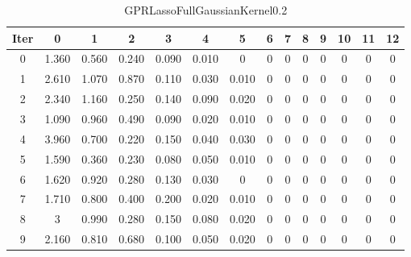 \begin{table}
	\begin{center}
		\begin{tabular}{|c|c|c|c|c|c|c|c|c|c|c|c|c|c|}
			\hline
			Iter & 0 & 1 & 2 & 3 & 4 & 5 & 6 & 7 & 8 & 9 & 10 & 11 & 12 \\
			\hline
			0 & 1.360 & 0.560 & 0.240 & 0.090 & 0.010 & 0 & 0 & 0 & 0 & 0 & 0 & 0 & 0 \\
			\hline
			1 & 2.610 & 1.070 & 0.870 & 0.110 & 0.030 & 0.010 & 0 & 0 & 0 & 0 & 0 & 0 & 0 \\
			\hline
			2 & 2.340 & 1.160 & 0.250 & 0.140 & 0.090 & 0.020 & 0 & 0 & 0 & 0 & 0 & 0 & 0 \\
			\hline
			3 & 1.090 & 0.960 & 0.490 & 0.090 & 0.020 & 0.010 & 0 & 0 & 0 & 0 & 0 & 0 & 0 \\
			\hline
			4 & 3.960 & 0.700 & 0.220 & 0.150 & 0.040 & 0.030 & 0 & 0 & 0 & 0 & 0 & 0 & 0 \\
			\hline
			5 & 1.590 & 0.360 & 0.230 & 0.080 & 0.050 & 0.010 & 0 & 0 & 0 & 0 & 0 & 0 & 0 \\
			\hline
			6 & 1.620 & 0.920 & 0.280 & 0.130 & 0.030 & 0 & 0 & 0 & 0 & 0 & 0 & 0 & 0 \\
			\hline
			7 & 1.710 & 0.800 & 0.400 & 0.200 & 0.020 & 0.010 & 0 & 0 & 0 & 0 & 0 & 0 & 0 \\
			\hline
			8 & 3 & 0.990 & 0.280 & 0.150 & 0.080 & 0.020 & 0 & 0 & 0 & 0 & 0 & 0 & 0 \\
			\hline
			9 & 2.160 & 0.810 & 0.680 & 0.100 & 0.050 & 0.020 & 0 & 0 & 0 & 0 & 0 & 0 & 0 \\
			\hline
		\end{tabular}
	\end{center}
	\caption{GPRLassoFullGaussianKernel0.2}
\end{table}
